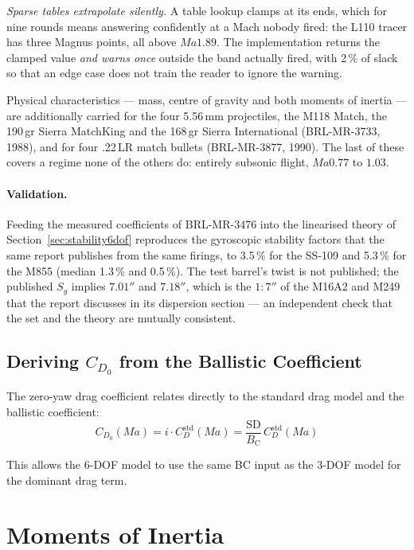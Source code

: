 \documentclass[11pt,twoside,openright]{report}
\newcommand{\Bc}{B_{\mathrm{C}}}
\newcommand{\Mach}{\mathit{Ma}}
\newcommand{\sd}{\mathrm{SD}}
\begin{document}
\emph{Sparse tables extrapolate silently.} A table lookup clamps at its ends, which
for nine rounds means answering confidently at a Mach nobody fired: the L110 tracer
has three Magnus points, all above $\Mach 1.89$. The implementation returns the
clamped value \emph{and warns once} outside the band actually fired, with 2\,\% of
slack so that an edge case does not train the reader to ignore the warning.

Physical characteristics --- mass, centre of gravity and both moments of inertia ---
are additionally carried for the four 5.56\,mm projectiles, the M118 Match, the
190\,gr Sierra MatchKing and the 168\,gr Sierra International (BRL-MR-3733, 1988),
and for four .22\,LR match bullets (BRL-MR-3877, 1990). The last of these covers a
regime none of the others do: entirely subsonic flight, $\Mach 0.77$ to $1.03$.

\paragraph{Validation.} Feeding the measured coefficients of BRL-MR-3476 into the
linearised theory of Section~\ref{sec:stability6dof} reproduces the
gyroscopic stability factors that the same report publishes from the same firings, to
3.5\,\% for the SS-109 and 5.3\,\% for the M855 (median 1.3\,\% and 0.5\,\%). The
test barrel's twist is not published; the published $S_g$ implies $7.01''$ and
$7.18''$, which is the $1{:}7''$ of the M16A2 and M249 that the report discusses in
its dispersion section --- an independent check that the set and the theory are
mutually consistent.

\subsection{Deriving $C_{D_0}$ from the Ballistic Coefficient}

The zero-yaw drag coefficient relates directly to the standard drag model and the ballistic coefficient:
\begin{equation}
  C_{D_0}(\Mach) = i \cdot C_D^{\mathrm{std}}(\Mach) = \frac{\sd}{\Bc}\,C_D^{\mathrm{std}}(\Mach)
  \label{eq:cd0_from_bc}
\end{equation}

This allows the 6-DOF model to use the same BC input as the 3-DOF model for the dominant drag term.

\section{Moments of Inertia}
\label{sec:inertia}
\end{document}
